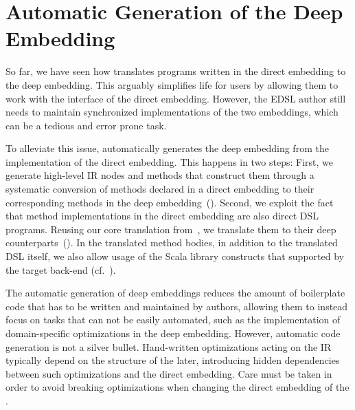 \section{Automatic Generation of the Deep Embedding}
\label{sec:deep-gen}

So far, we have seen how \tool translates programs written in the
direct embedding to the deep embedding.
This arguably simplifies life for \edsl users by allowing them to work
with the interface
of the direct embedding.  However, the EDSL author still needs to
maintain synchronized implementations of the two embeddings, which can
be a tedious and error prone task.

To alleviate this issue, \tool automatically generates the deep embedding from
the implementation of the direct embedding. This happens in two steps: First, we
generate high-level IR nodes and methods that construct them through a
systematic conversion of methods declared in a direct embedding to their
corresponding methods in the deep embedding~().
%
Second, we exploit the fact that method implementations in the direct
embedding are also direct DSL programs.  Reusing our core translation
from~, we translate them to their deep
counterparts~().
In the translated method bodies, in addition to the translated DSL itself, we also allow
usage of the Scala library constructs that supported by the target back-end (cf.~\cite{techrep}).

The automatic generation of deep embeddings reduces the amount of
boilerplate code that has to be written and maintained by \edsl
authors, allowing them to instead focus on tasks that can not be
easily automated, such as the implementation of domain-specific
optimizations in the deep embedding.  However, automatic code
generation is not a silver bullet.  Hand-written optimizations acting
on the IR typically depend on the structure of the later, introducing
hidden dependencies between such optimizations and the direct
embedding.  Care must be taken in order to avoid breaking
optimizations when changing the direct embedding of the \edsl.


